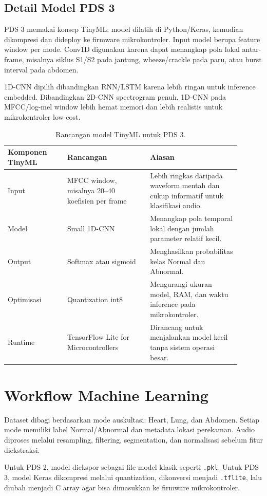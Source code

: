 \documentclass[12pt,a4paper]{article}
\begin{document}
\subsection{Detail Model PDS 3}
PDS 3 memakai konsep TinyML: model dilatih di Python/Keras, kemudian dikompresi dan dideploy ke firmware mikrokontroler. Input model berupa feature window per mode. Conv1D digunakan karena dapat menangkap pola lokal antar-frame, misalnya siklus S1/S2 pada jantung, wheeze/crackle pada paru, atau burst interval pada abdomen.

1D-CNN dipilih dibandingkan RNN/LSTM karena lebih ringan untuk inference embedded. Dibandingkan 2D-CNN spectrogram penuh, 1D-CNN pada MFCC/log-mel window lebih hemat memori dan lebih realistis untuk mikrokontroler low-cost.

\begin{table}[H]
\centering
\begin{tabular}{p{0.23\linewidth}p{0.32\linewidth}p{0.35\linewidth}}
\toprule
\textbf{Komponen TinyML} & \textbf{Rancangan} & \textbf{Alasan} \\
\midrule
Input & MFCC window, misalnya 20--40 koefisien per frame & Lebih ringkas daripada waveform mentah dan cukup informatif untuk klasifikasi audio. \\
Model & Small 1D-CNN & Menangkap pola temporal lokal dengan jumlah parameter relatif kecil. \\
Output & Softmax atau sigmoid & Menghasilkan probabilitas kelas Normal dan Abnormal. \\
Optimisasi & Quantization int8 & Mengurangi ukuran model, RAM, dan waktu inference pada mikrokontroler. \\
Runtime & TensorFlow Lite for Microcontrollers & Dirancang untuk menjalankan model kecil tanpa sistem operasi besar. \\
\bottomrule
\end{tabular}
\caption{Rancangan model TinyML untuk PDS 3.}
\end{table}

\section{Workflow Machine Learning}
Dataset dibagi berdasarkan mode auskultasi: Heart, Lung, dan Abdomen. Setiap mode memiliki label Normal/Abnormal dan metadata lokasi perekaman. Audio diproses melalui resampling, filtering, segmentation, dan normalisasi sebelum fitur diekstraksi.

Untuk PDS 2, model diekspor sebagai file model klasik seperti \texttt{.pkl}. Untuk PDS 3, model Keras dikompresi melalui quantization, dikonversi menjadi \texttt{.tflite}, lalu diubah menjadi C array agar bisa dimasukkan ke firmware mikrokontroler.
\end{document}
